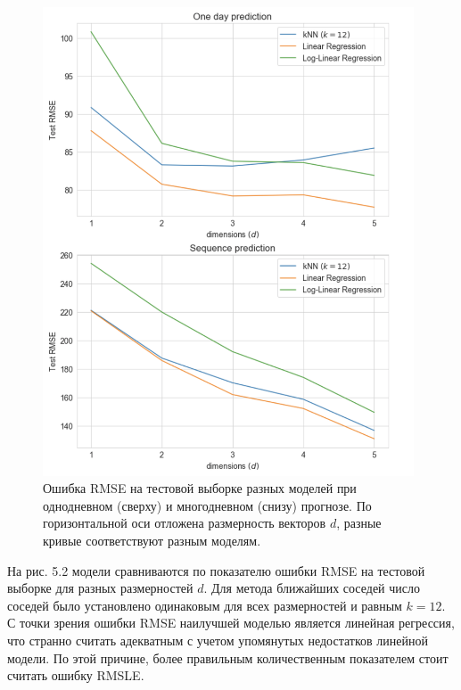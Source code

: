 \documentclass[a4paper, 12pt]{article}
\begin{document}
\begin{figure}[H]
    \centering
    \includegraphics[width=11cm]{models_rmse.png}
    \caption{Ошибка RMSE на тестовой выборке разных моделей при однодневном (сверху) и многодневном (снизу) прогнозе. По горизонтальной оси отложена размерность векторов $d$, разные кривые соответствуют разным моделям.}
    \label{fig:my_label}
\end{figure}

На рис. 5.2 модели сравниваются по показателю ошибки RMSE на тестовой выборке для разных размерностей $d$. Для метода ближайших соседей число соседей было установлено одинаковым для всех размерностей и равным $k=12$. С точки зрения ошибки RMSE наилучшей моделью является линейная регрессия, что странно считать адекватным с учетом упомянутых недостатков линейной модели. По этой причине, более правильным количественным показателем стоит считать ошибку RMSLE.
\end{document}
